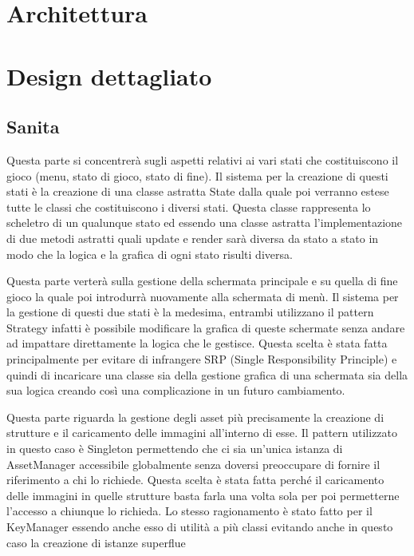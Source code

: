 \documentclass[a4paper,12pt]{report}
\begin{document}
    \section{Architettura}
    \section{Design dettagliato} 
    \subsection{Sanita}
    \par Questa parte si concentrerà sugli aspetti relativi ai vari stati che costituiscono il gioco (menu, stato di gioco, stato di fine).
     Il sistema per la creazione di questi stati è la creazione di una classe astratta State dalla quale poi verranno
     estese tutte le classi che costituiscono i diversi stati. Questa classe rappresenta lo scheletro di un qualunque
     stato ed essendo una classe astratta l’implementazione di due metodi astratti quali update e render sarà diversa da
     stato a stato in modo che la logica e la grafica di ogni stato risulti diversa.
    \par Questa parte verterà sulla gestione della schermata principale e su quella di fine gioco la quale poi introdurrà nuovamente
     alla schermata di menù. Il sistema per la gestione di questi due stati è la medesima, entrambi utilizzano il pattern Strategy
     infatti è possibile modificare la grafica di queste schermate senza andare ad impattare direttamente la logica che le gestisce.
     Questa scelta è stata fatta principalmente per evitare di infrangere SRP (Single Responsibility Principle) e quindi
     di incaricare una classe sia della gestione grafica di una schermata sia della sua logica creando così una complicazione
     in un futuro cambiamento.
    \par Questa parte riguarda la gestione degli asset più precisamente la creazione di strutture e il caricamento delle
    immagini all’interno di esse. Il pattern utilizzato in questo caso è Singleton permettendo che ci sia un'unica istanza
    di AssetManager accessibile globalmente senza doversi preoccupare di fornire il riferimento a chi lo richiede.
    Questa scelta è stata fatta perché il caricamento delle immagini in quelle strutture basta farla una volta sola per poi
    permetterne l’accesso a chiunque lo richieda. Lo stesso ragionamento è stato fatto per il KeyManager essendo anche esso
    di utilità a più classi evitando anche in questo caso la creazione di istanze superflue
\end{document}

